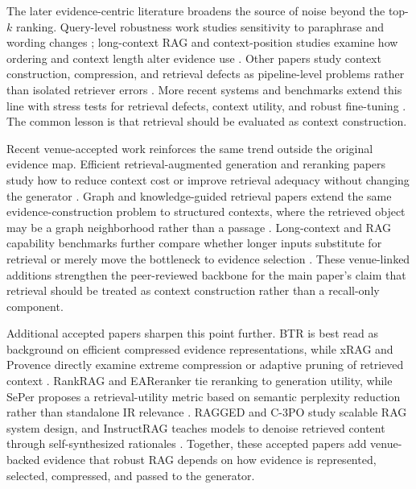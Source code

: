 \documentclass[11pt]{article}
\begin{document}
The later evidence-centric literature broadens the source of noise beyond the top-$k$ ranking. Query-level robustness work studies sensitivity to paraphrase and wording changes \citep{queryRobustness2025}; long-context RAG and context-position studies examine how ordering and context length alter evidence use \citep{rrag140,rrag143,rrag154,rrag166,rrag168,rrag170}. Other papers study context construction, compression, and retrieval defects as pipeline-level problems rather than isolated retriever errors \citep{rrag174,rrag179,rrag180,rrag181,rrag182,rrag183,rrag184}. More recent systems and benchmarks extend this line with stress tests for retrieval defects, context utility, and robust fine-tuning \citep{rrag200,rrag201,rrag206,rrag210,rrag212,rrag215,rrag218,rrag219,rrag224,rrag225,rrag226}. The common lesson is that retrieval should be evaluated as context construction.

Recent venue-accepted work reinforces the same trend outside the original evidence map. Efficient retrieval-augmented generation and reranking papers study how to reduce context cost or improve retrieval adequacy without changing the generator \citep{venueAcc013,venueAcc017,venueAcc018}. Graph and knowledge-guided retrieval papers extend the same evidence-construction problem to structured contexts, where the retrieved object may be a graph neighborhood rather than a passage \citep{venueAcc004,venueAcc006,venueAcc008,venueAcc009,venueAcc012,venueAcc023}. Long-context and RAG capability benchmarks further compare whether longer inputs substitute for retrieval or merely move the bottleneck to evidence selection \citep{venueAcc028,venueAcc030}. These venue-linked additions strengthen the peer-reviewed backbone for the main paper's claim that retrieval should be treated as context construction rather than a recall-only component.

Additional accepted papers sharpen this point further. BTR is best read as background on efficient compressed evidence representations, while xRAG and Provence directly examine extreme compression or adaptive pruning of retrieved context \citep{venueExtra003,venueExtra015,venueExtra007}. RankRAG and EAReranker tie reranking to generation utility, while SePer proposes a retrieval-utility metric based on semantic perplexity reduction rather than standalone IR relevance \citep{venueExtra014,venueExtra002,venueExtra009}. RAGGED and C-3PO study scalable RAG system design, and InstructRAG teaches models to denoise retrieved content through self-synthesized rationales \citep{venueExtra013,venueExtra012,venueExtra008}. Together, these accepted papers add venue-backed evidence that robust RAG depends on how evidence is represented, selected, compressed, and passed to the generator.
\end{document}
